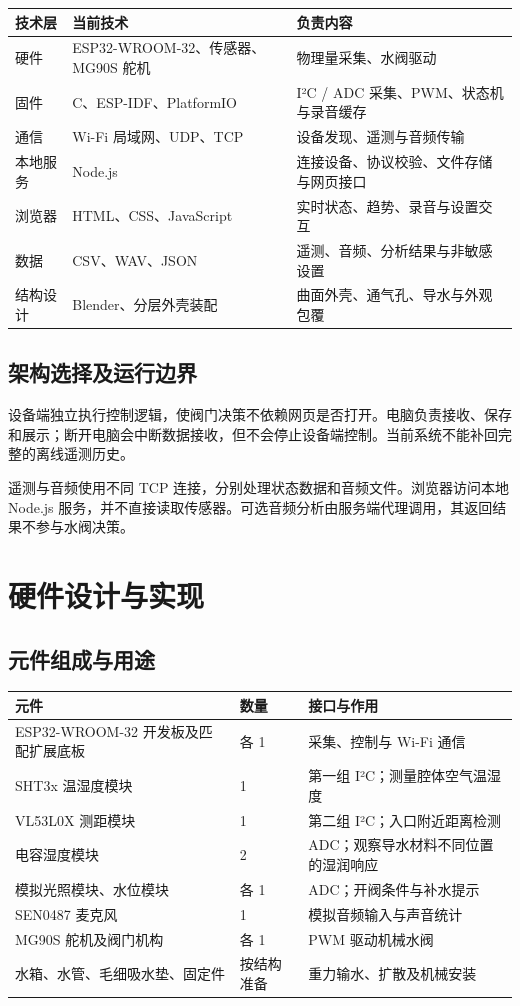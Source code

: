 \documentclass[10pt,a4paper]{article}
\begin{document}
\begin{longtable}{p{42mm}p{59mm}p{58mm}}
\toprule
\textbf{技术层} & \textbf{当前技术} & \textbf{负责内容}\\\midrule\endhead
硬件 & ESP32-WROOM-32、传感器、MG90S 舵机 & 物理量采集、水阀驱动\\
固件 & C、ESP-IDF、PlatformIO & I²C / ADC 采集、PWM、状态机与录音缓存\\
通信 & Wi-Fi 局域网、UDP、TCP & 设备发现、遥测与音频传输\\
本地服务 & Node.js & 连接设备、协议校验、文件存储与网页接口\\
浏览器 & HTML、CSS、JavaScript & 实时状态、趋势、录音与设置交互\\
数据 & CSV、WAV、JSON & 遥测、音频、分析结果与非敏感设置\\
结构设计 & Blender、分层外壳装配 & 曲面外壳、通气孔、导水与外观包覆\\
\bottomrule\end{longtable}

\subsection{架构选择及运行边界}

设备端独立执行控制逻辑，使阀门决策不依赖网页是否打开。电脑负责接收、保存和展示；断开电脑会中断数据接收，但不会停止设备端控制。当前系统不能补回完整的离线遥测历史。


遥测与音频使用不同 TCP 连接，分别处理状态数据和音频文件。浏览器访问本地 Node.js 服务，并不直接读取传感器。可选音频分析由服务端代理调用，其返回结果不参与水阀决策。


\clearpage
\section{硬件设计与实现}

\subsection{元件组成与用途}

\begin{longtable}{p{42mm}p{59mm}p{58mm}}
\toprule
\textbf{元件} & \textbf{数量} & \textbf{接口与作用}\\\midrule\endhead
ESP32-WROOM-32 开发板及匹配扩展底板 & 各 1 & 采集、控制与 Wi-Fi 通信\\
SHT3x 温湿度模块 & 1 & 第一组 I²C；测量腔体空气温湿度\\
VL53L0X 测距模块 & 1 & 第二组 I²C；入口附近距离检测\\
电容湿度模块 & 2 & ADC；观察导水材料不同位置的湿润响应\\
模拟光照模块、水位模块 & 各 1 & ADC；开阀条件与补水提示\\
SEN0487 麦克风 & 1 & 模拟音频输入与声音统计\\
MG90S 舵机及阀门机构 & 各 1 & PWM 驱动机械水阀\\
水箱、水管、毛细吸水垫、固定件 & 按结构准备 & 重力输水、扩散及机械安装\\
\bottomrule\end{longtable}
\end{document}
